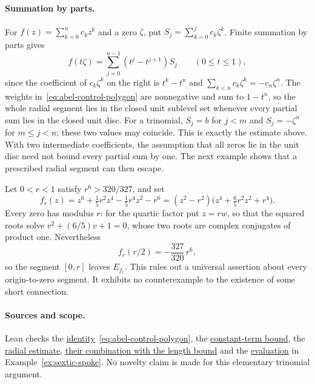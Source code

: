 \documentclass[11pt]{article}
\begin{document}
\paragraph{Summation by parts.}
\label{subsec:abel-mechanism}
For $f(z)=\sum_{k=0}^nc_kz^k$ and a zero $\zeta$, put
$S_j=\sum_{k=0}^jc_k\zeta^k$.  Finite summation by parts gives
\begin{equation}\label{eq:abel-control-polygon}
 f(t\zeta)=\sum_{j=0}^{n-1}(t^j-t^{j+1})S_j\qquad(0\le t\le1),
\end{equation}
since the coefficient of $c_k\zeta^k$ on the right is $t^k-t^n$ and
$\sum_{k<n}c_k\zeta^k=-c_n\zeta^n$.  The weights
in~\eqref{eq:abel-control-polygon} are nonnegative and sum to $1-t^n$, so the
whole radial segment lies in the closed unit sublevel set whenever every partial sum lies in the closed
unit disc. For a trinomial, $S_j=b$ for $j<m$ and $S_j=-\zeta^n$
for $m\le j<n$; these two values may coincide. This is exactly the
estimate above. With two intermediate coefficients, the assumption
that all zeros lie in the unit disc need not bound every partial sum
by one. The next
example shows that a prescribed radial segment can then escape.

\begin{example}\label{ex:sextic-spoke}
Let $0<r<1$ satisfy $r^6>320/327$, and set
\[
 f_r(z)=z^6+\tfrac15r^2z^4-\tfrac15r^4z^2-r^6
       =(z^2-r^2)\bigl(z^4+\tfrac65r^2z^2+r^4\bigr).
\]
Every zero has modulus $r$: for the quartic factor put $z=rw$, so that the
squared roots solve $v^2+(6/5)v+1=0$, whose two roots are complex conjugates
of product one.  Nevertheless
\[
 f_r(r/2)=-\frac{327}{320}\,r^6,
\]
so the segment $[0,r]$ leaves $E_{f_r}$.  This rules out a universal assertion
about every origin-to-zero segment.  It exhibits no counterexample to the
existence of some short connection.
\end{example}

\paragraph{Sources and scope.}
\label{bdry:trinomial}
Lean checks the
\href{https://github.com/wcook04/plectis-erdos/blob/0ba585f632fbbbb43af2ee9532d4e83752af3f67/ErdosProblems/Erdos1041/AbelControlPolygon.lean\#L123}{identity}~\eqref{eq:abel-control-polygon}, the
\href{https://github.com/wcook04/plectis-erdos/blob/0ba585f632fbbbb43af2ee9532d4e83752af3f67/ErdosProblems/Erdos1041/AbelControlPolygon.lean\#L258}{constant-term bound},
the
\href{https://github.com/wcook04/plectis-erdos/blob/0ba585f632fbbbb43af2ee9532d4e83752af3f67/ErdosProblems/Erdos1041/AbelControlPolygon.lean\#L219}{radial estimate},
\href{https://github.com/wcook04/plectis-erdos/blob/0ba585f632fbbbb43af2ee9532d4e83752af3f67/ErdosProblems/Erdos1041/AbelControlPolygon.lean\#L330}{their combination with the length bound}
and the
\href{https://github.com/wcook04/plectis-erdos/blob/0ba585f632fbbbb43af2ee9532d4e83752af3f67/ErdosProblems/Erdos1041/AbelControlPolygon.lean\#L555}{evaluation} in Example~\ref{ex:sextic-spoke}.  No novelty claim is made for this elementary trinomial argument.
\end{document}
